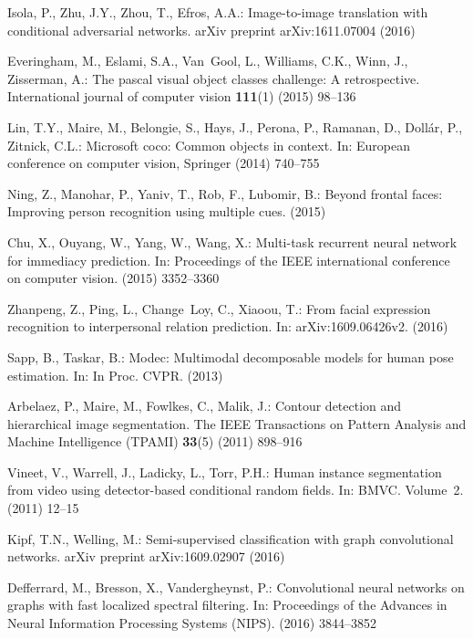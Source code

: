 \documentclass[10pt, letterpaper]{article}
\begin{document}
\begin{thebibliography}{10}
Isola, P., Zhu, J.Y., Zhou, T., Efros, A.A.:
\newblock Image-to-image translation with conditional adversarial networks.
\newblock arXiv preprint arXiv:1611.07004 (2016)

Everingham, M., Eslami, S.A., Van~Gool, L., Williams, C.K., Winn, J.,
  Zisserman, A.:
\newblock The pascal visual object classes challenge: A retrospective.
\newblock International journal of computer vision \textbf{111}(1) (2015)
  98--136

Lin, T.Y., Maire, M., Belongie, S., Hays, J., Perona, P., Ramanan, D.,
  Doll{\'a}r, P., Zitnick, C.L.:
\newblock Microsoft coco: Common objects in context.
\newblock In: European conference on computer vision, Springer (2014)  740--755

Ning, Z., Manohar, P., Yaniv, T., Rob, F., Lubomir, B.:
\newblock Beyond frontal faces: Improving person recognition using multiple
  cues.
\newblock (2015)

Chu, X., Ouyang, W., Yang, W., Wang, X.:
\newblock Multi-task recurrent neural network for immediacy prediction.
\newblock In: Proceedings of the IEEE international conference on computer
  vision. (2015)  3352--3360

Zhanpeng, Z., Ping, L., Change~Loy, C., Xiaoou, T.:
\newblock From facial expression recognition to interpersonal relation
  prediction.
\newblock In: arXiv:1609.06426v2. (2016)

Sapp, B., Taskar, B.:
\newblock Modec: Multimodal decomposable models for human pose estimation.
\newblock In: In Proc. CVPR. (2013)

Arbelaez, P., Maire, M., Fowlkes, C., Malik, J.:
\newblock Contour detection and hierarchical image segmentation.
\newblock The IEEE Transactions on Pattern Analysis and Machine Intelligence
  (TPAMI) \textbf{33}(5) (2011)  898--916

Vineet, V., Warrell, J., Ladicky, L., Torr, P.H.:
\newblock Human instance segmentation from video using detector-based
  conditional random fields.
\newblock In: BMVC. Volume~2. (2011)  12--15

Kipf, T.N., Welling, M.:
\newblock Semi-supervised classification with graph convolutional networks.
\newblock arXiv preprint arXiv:1609.02907 (2016)

Defferrard, M., Bresson, X., Vandergheynst, P.:
\newblock Convolutional neural networks on graphs with fast localized spectral
  filtering.
\newblock In: Proceedings of the Advances in Neural Information Processing
  Systems (NIPS). (2016)  3844--3852


\end{thebibliography}
\end{document}
